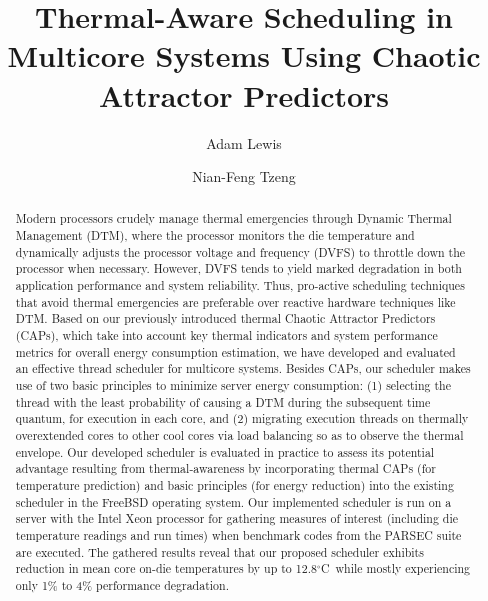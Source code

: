 \documentclass[times, 10pt,twocolumn]{IEEEtran}
\begin{document}
\title{Thermal-Aware Scheduling in  Multicore Systems Using Chaotic
  Attractor Predictors} 
\author{Adam  Lewis} 
\author{Nian-Feng Tzeng} 
\date{}
\maketitle  
\newtheorem{defn}{Definition}
\newtheorem{thm}{Theorem}
\thispagestyle{empty}
\begin{abstract}
  Modern processors crudely manage thermal emergencies through Dynamic
  Thermal Management (DTM), where the processor monitors the die
  temperature and dynamically adjusts the processor voltage and
  frequency (DVFS) to throttle down the processor when
  necessary. However, DVFS tends to yield marked degradation in both
  application performance and system reliability. Thus, pro-active
  scheduling techniques that avoid thermal emergencies are preferable
  over reactive hardware techniques like DTM.  Based on our previously
  introduced thermal Chaotic Attractor Predictors (CAPs), which take into
  account key thermal indicators and system performance metrics for
  overall energy consumption estimation, 
  we have developed and evaluated an effective thread
  scheduler for multicore systems.  Besides CAPs, our scheduler makes
  use of two basic principles to minimize server energy consumption: (1)
  selecting the thread with the least probability of causing a DTM during
  the subsequent time quantum, for execution in each core,
  and (2) migrating execution threads on thermally overextended cores to
  other cool cores via load balancing so as to observe the thermal
  envelope.  Our developed scheduler is evaluated in practice to assess
  its potential advantage resulting from thermal-awareness by
  incorporating thermal CAPs (for temperature prediction) and basic principles
  (for energy reduction) into the existing scheduler in the FreeBSD
  operating system.  Our implemented scheduler is run on a server with
  the Intel Xeon processor for gathering measures of interest (including
  die temperature readings and run times) when benchmark codes
  from the PARSEC suite are executed.  The gathered
  results reveal that our proposed scheduler exhibits reduction in mean
  core on-die temperatures by up to 12.8$^{\circ}$C\ while mostly experiencing
  only 1\% to 4\% performance degradation.
\end{abstract}
\end{document}
